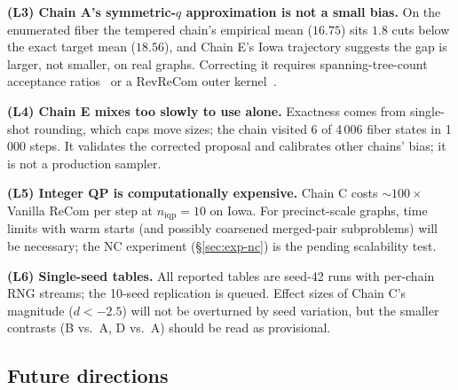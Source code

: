 \documentclass[11pt]{article}
\begin{document}
\textbf{(L3) Chain A's symmetric-$q$ approximation is not a small
bias.} On the enumerated fiber the tempered chain's empirical mean
($16.75$) sits $1.8$ cuts below the exact target mean ($18.56$), and
Chain E's Iowa trajectory suggests the gap is larger, not smaller, on
real graphs. Correcting it requires spanning-tree-count acceptance
ratios~\cite{autry2023metropolized} or a RevReCom outer
kernel~\cite{cannon2022spanning}.

\textbf{(L4) Chain E mixes too slowly to use alone.} Exactness comes
from single-shot rounding, which caps move sizes; the chain visited
6 of 4\,006 fiber states in 1\,000 steps. It validates the corrected
proposal and calibrates other chains' bias; it is not a production
sampler.

\textbf{(L5) Integer QP is computationally expensive.} Chain C costs
$\sim 100\times$ Vanilla ReCom per step at $n_{\mathrm{iqp}} = 10$ on
Iowa. For precinct-scale graphs, time limits with warm starts (and
possibly coarsened merged-pair subproblems) will be necessary; the
NC experiment (\S\ref{sec:exp-nc}) is the pending scalability test.

\textbf{(L6) Single-seed tables.} All reported tables are seed-42
runs with per-chain RNG streams; the 10-seed replication is queued.
Effect sizes of Chain C's magnitude ($d < -2.5$) will not be
overturned by seed variation, but the smaller contrasts (B vs.\ A,
D vs.\ A) should be read as provisional.

\subsection{Future directions}\label{sec:disc-future}
\end{document}
